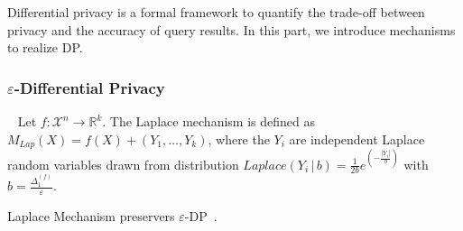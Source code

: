 Differential privacy is a formal framework to quantify the trade-off between privacy and the accuracy of query results. In this part, we introduce mechanisms to realize DP.

\subsubsection{$\varepsilon$-Differential Privacy}
\begin{definition}\
    \label{def:laplaceMechanism}
    Let $f : \mathcal{X}^{n} \rightarrow \mathbb{R}^{k}$. The Laplace mechanism is defined as $M_{Lap}\left( X\right) =f\left( X\right) +\left( Y_{1},\ldots ,Y_{k}\right) $, where the $Y_{i}$ are independent Laplace random variables drawn from distribution $Laplace \left(  Y_{i}\,|\, b\right) =\frac{1}{2b}e^{\left( -\frac{\left  | Y_{i}\right|}{b}\right)} $ with $b=\frac{\Delta _{1}^{\left(f\right)}}{\varepsilon }$.
\end{definition}

\begin{theorem}
    Laplace Mechanism preservers $\varepsilon$-DP~\cite{dwork2014algorithmic}.
\end{theorem}




